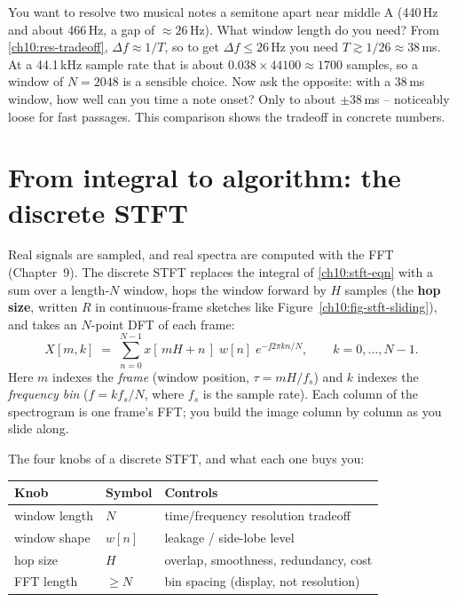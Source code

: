 \begin{walkbox}
You want to resolve two musical notes a semitone apart near middle A (440\,Hz and
about 466\,Hz, a gap of $\approx 26$\,Hz). What window length do you need? From
\eqref{ch10:res-tradeoff}, $\Delta f \approx 1/T$, so to get $\Delta f \le 26$\,Hz
you need $T \gtrsim 1/26 \approx 38$\,ms. At a 44.1\,kHz sample rate that is about
$0.038 \times 44100 \approx 1700$ samples, so a window of $N = 2048$ is a sensible
choice. Now ask the opposite: with a 38\,ms window, how well can you time a note
onset? Only to about $\pm 38$\,ms -- noticeably loose for fast passages. This comparison
shows the tradeoff in concrete numbers.
\end{walkbox}

\section{From integral to algorithm: the discrete STFT}
\label{ch10:discrete}

Real signals are sampled, and real spectra are computed with the FFT
(Chapter~9). The discrete STFT replaces the integral of
\eqref{ch10:stft-eqn} with a sum over a length-$N$ window, hops the window forward
by $H$ samples (the \textbf{hop size}, written $R$ in continuous-frame sketches like Figure~\ref{ch10:fig-stft-sliding}), and takes an $N$-point DFT of each frame:
\begin{equation}
\label{ch10:dstft}
X[m, k] \;=\; \sum_{n=0}^{N-1} x[\,mH + n\,]\; w[n]\; e^{-\jj 2\pi k n / N},
\qquad k = 0,\dots,N-1 .
\end{equation}
Here $m$ indexes the \emph{frame} (window position, $\tau = mH/f_s$) and $k$
indexes the \emph{frequency bin} ($f = k f_s / N$, where $f_s$ is the sample
rate). Each column of the spectrogram is one frame's FFT; you build the image
column by column as you slide along.

\begin{focusbox}
The four knobs of a discrete STFT, and what each one buys you:
\begin{center}
\begin{tabular}{@{}lll@{}}
\toprule
Knob & Symbol & Controls \\
\midrule
window length & $N$ & time/frequency resolution tradeoff \\
window shape & $w[n]$ & leakage / side-lobe level \\
hop size & $H$ & overlap, smoothness, redundancy, cost \\
FFT length & $\ge N$ & bin spacing (display, not resolution) \\
\bottomrule
\end{tabular}
\end{center}
\end{focusbox}

